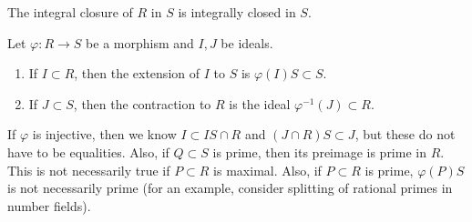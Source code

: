 \message{ !name(notes.tex)}\documentclass[10pt, twoside]{article}
\begin{document}
        \begin{cor}
            The integral closure of $R$ in $S$ is integrally closed in $S$.
        \end{cor}
               
        \begin{defn}
            Let $\varphi:R \to S$ be a morphism and $I,J$ be ideals.
            \begin{enumerate}
                \item If $I \subset R$, then the extension of $I$ to $S$ is $\varphi(I)S \subset S$.
                \item If $J \subset S$, then the contraction to $R$ is the ideal $\varphi^{-1}(J) \subset R$.
            \end{enumerate}
        \end{defn}

        If $\varphi$ is injective, then we know $I \subset IS \cap R$ and $(J \cap R)S \subset J$, but these do not have to be equalities. Also, if $Q \subset S$ is prime, then its preimage is prime in $R$. This is not necessarily true if $P \subset R$ is maximal. Also, if $P \subset R$ is prime, $\varphi(P)S$ is not necessarily prime (for an example, consider splitting of rational primes in number fields).
        
\end{document}
